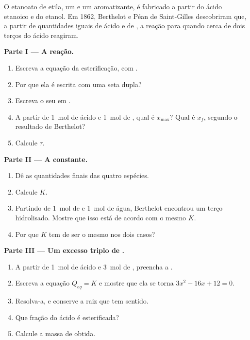 \begin{problem}
\label{pb:g12:equilibrium:1}
O etanoato de etila, um  e um aromatizante, é fabricado a partir
do ácido etanoico e do etanol. Em 1862, Berthelot e Péan de Saint-Gilles
descobriram que, a partir de quantidades iguais de ácido e de , a
reação para quando cerca de dois terços do ácido reagiram.

\medskip
\noindent\textbf{Parte I --- A reação.}
\begin{enumerate}
  \item Escreva a equação da esterificação, com .
  \item Por que ela é escrita com uma seta dupla?
  \item Escreva o seu  em .
  \item A partir de \qty{1}{mol} de ácido e \qty{1}{mol} de , qual
        é $x_{\max}$? Qual é $x_f$, segundo o resultado de Berthelot?
  \item Calcule $\tau$.
\end{enumerate}

\medskip
\noindent\textbf{Parte II --- A constante.}
\begin{enumerate}[resume]
  \item Dê as quantidades finais das quatro espécies.
  \item Calcule $K$.
  \item Partindo de \qty{1}{mol} de  e \qty{1}{mol} de água,
        Berthelot encontrou um terço hidrolisado. Mostre que isso está
        de acordo com o mesmo $K$.
  \item Por que $K$ tem de ser o mesmo nos dois casos?
\end{enumerate}

\medskip
\noindent\textbf{Parte III --- Um excesso triplo de .}
\begin{enumerate}[resume]
  \item A partir de \qty{1}{mol} de ácido e \qty{3}{mol} de ,
        preencha a .
  \item Escreva a equação $Q_{eq} = K$ e mostre que ela se torna
        $3x^2 - 16x + 12 = 0$.
  \item Resolva-a, e conserve a raiz que tem sentido.
  \item Que fração do ácido é esterificada?
  \item Calcule a massa de  obtida.
\end{enumerate}


\end{problem}
